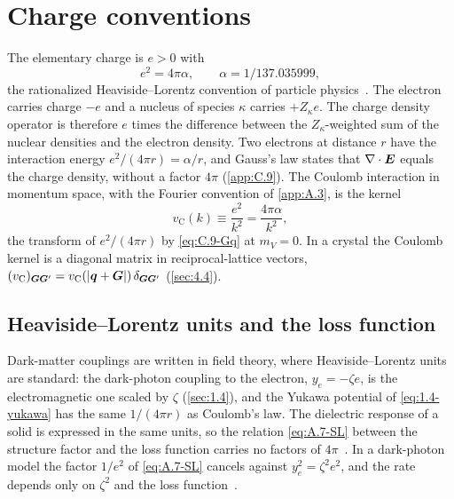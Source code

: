 \section{Charge conventions}\label{app:A.2}

The elementary charge is $e > 0$ with
\begin{equation}
  e^2 = 4\pi\alpha, \qquad \alpha = 1/137.035999,
  \label{eq:A.2-e2}
\end{equation}
the rationalized Heaviside--Lorentz convention of particle physics~\cite{mohr2025codata}. The electron carries charge $-e$ and a nucleus of species $\kappa$ carries $+Z_\kappa e$. The charge density operator is therefore $e$ times the difference between the $Z_\kappa$-weighted sum of the nuclear densities and the electron density. Two electrons at distance $r$ have the interaction energy $e^2/(4\pi r) = \alpha/r$, and Gauss's law states that $\nabla\cdot\bm{E}$ equals the charge density, without a factor $4\pi$ (\cref{app:C.9}). The Coulomb interaction in momentum space, with the Fourier convention of \cref{app:A.3}, is the kernel
\begin{equation}
  v_{\mathrm{C}}(k) \equiv \frac{e^2}{k^2} = \frac{4\pi\alpha}{k^2},
  \label{eq:A.2-vC}
\end{equation}
the transform of $e^2/(4\pi r)$ by \cref{eq:C.9-Gq} at $m_V = 0$. In a crystal the Coulomb kernel is a diagonal matrix in reciprocal-lattice vectors, $(v_{\mathrm{C}})_{\bm{G}\bm{G}'} = v_{\mathrm{C}}(|\bm{q}+\bm{G}|)\,\delta_{\bm{G}\bm{G}'}$ (\cref{sec:4.4}).

\subsection{Heaviside--Lorentz units and the loss function}

Dark-matter couplings are written in field theory, where Heaviside--Lorentz units are standard: the dark-photon coupling to the electron, $y_e = -\zeta e$, is the electromagnetic one scaled by $\zeta$ (\cref{sec:1.4}), and the Yukawa potential of \cref{eq:1.4-yukawa} has the same $1/(4\pi r)$ as Coulomb's law. The dielectric response of a solid is expressed in the same units, so the relation \cref{eq:A.7-SL} between the structure factor and the loss function carries no factors of $4\pi$~\cites[Eq.~(6)]{knapen2021dark}[Eq.~(S.7)]{hochberg2021determining}. In a dark-photon model the factor $1/e^2$ of \cref{eq:A.7-SL} cancels against $y_e^2 = \zeta^2e^2$, and the rate depends only on $\zeta^2$ and the loss function~\cite[below Eq.~(S.8)]{hochberg2021determining}.

